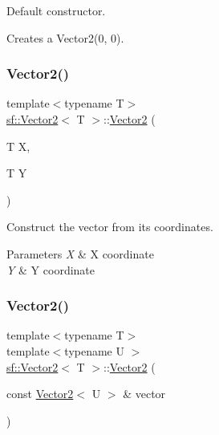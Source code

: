 Default constructor. 

Creates a Vector2(0, 0). \mbox{\label{classsf_1_1_vector2_aed26a72164e59e8a4a0aeee2049568f1}} 
\subsubsection{\texorpdfstring{Vector2()}{Vector2()}\hspace{0.1cm}{\footnotesize\ttfamily [2/3]}}
{\footnotesize\ttfamily template$<$typename T$>$ \\
\hyperlink{classsf_1_1_vector2}{sf\+::\+Vector2}$<$ T $>$\+::\hyperlink{classsf_1_1_vector2}{Vector2} (\begin{DoxyParamCaption}\item[{T}]{X,  }\item[{T}]{Y }\end{DoxyParamCaption})}



Construct the vector from its coordinates. 


\begin{DoxyParams}{Parameters}
{\em X} & X coordinate \\
\hline
{\em Y} & Y coordinate \\
\hline
\end{DoxyParams}
\mbox{\label{classsf_1_1_vector2_a3da455e0ae3f8ff6d2fe36d10b332d10}} 
\subsubsection{\texorpdfstring{Vector2()}{Vector2()}\hspace{0.1cm}{\footnotesize\ttfamily [3/3]}}
{\footnotesize\ttfamily template$<$typename T$>$ \\
template$<$typename U $>$ \\
\hyperlink{classsf_1_1_vector2}{sf\+::\+Vector2}$<$ T $>$\+::\hyperlink{classsf_1_1_vector2}{Vector2} (\begin{DoxyParamCaption}\item[{const \hyperlink{classsf_1_1_vector2}{Vector2}$<$ U $>$ \&}]{vector }\end{DoxyParamCaption})\hspace{0.3cm}{\ttfamily [explicit]}}



